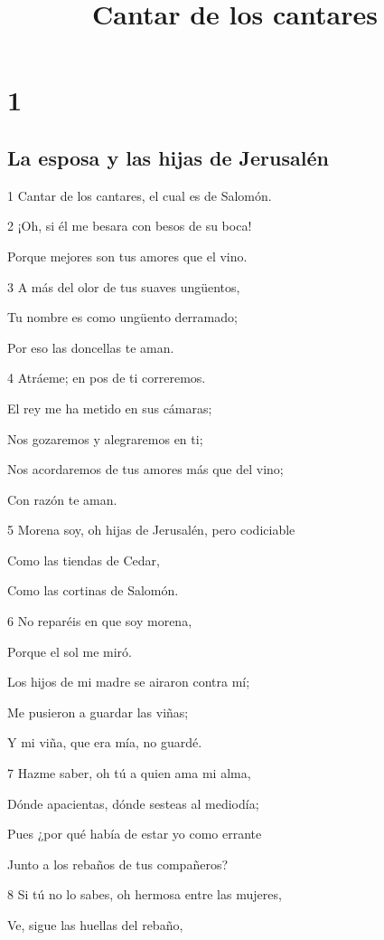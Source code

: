 

\title{Cantar de los cantares}

\chapter{1}

\section*{La esposa y las hijas de Jerusalén}

\par 1 Cantar de los cantares, el cual es de Salomón. 
\par 2 ¡Oh, si él me besara con besos de su boca!
\par Porque mejores son tus amores que el vino.
\par 3 A más del olor de tus suaves ungüentos,
\par Tu nombre es como ungüento derramado;
\par Por eso las doncellas te aman.
\par 4 Atráeme; en pos de ti correremos.
\par El rey me ha metido en sus cámaras;
\par Nos gozaremos y alegraremos en ti;
\par Nos acordaremos de tus amores más que del vino;
\par Con razón te aman.
\par 5 Morena soy, oh hijas de Jerusalén, pero codiciable
\par Como las tiendas de Cedar,
\par Como las cortinas de Salomón.
\par 6 No reparéis en que soy morena,
\par Porque el sol me miró.
\par Los hijos de mi madre se airaron contra mí;
\par Me pusieron a guardar las viñas;
\par Y mi viña, que era mía, no guardé.
\par 7 Hazme saber, oh tú a quien ama mi alma,
\par Dónde apacientas, dónde sesteas al mediodía;
\par Pues ¿por qué había de estar yo como errante
\par Junto a los rebaños de tus compañeros?
\par 8 Si tú no lo sabes, oh hermosa entre las mujeres,
\par Ve, sigue las huellas del rebaño,

